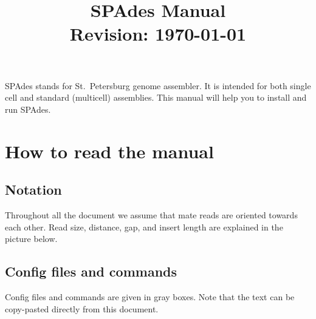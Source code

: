 \documentclass{article}
\def\spades{SPAdes}
\begin{document}
\title{{\spades} Manual\\{\small Revision: \today}}
\date{}
\maketitle

{\spades} stands for St.~Petersburg genome assembler.
It is intended for both single cell and standard (multicell) 
assemblies. This manual will help you to install and run
{\spades}.



\renewcommand{\contentsname}{}
\tableofcontents

\pagebreak

\listoftodos

\pagebreak

\section{How to read the manual}
\subsection{Notation}
Throughout all the document we assume that mate reads are oriented 
towards each other. Read size, distance, gap, and insert length are 
explained in the picture below.

\begin{center}
\end{center}

\subsection{Config files and commands}
Config files and commands are given in gray boxes. 
Note that the text can be copy-pasted directly from this document.
\end{document}
